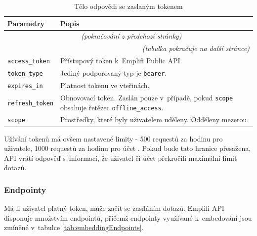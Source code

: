 \documentclass[czech, bc, kiv, he, iso690numb, viewonly]{fasthesis} %
\begin{document}
	\begin{longtable}{p{}p{}}
	\caption{Tělo odpovědi se zaslaným tokenem \cite{emplifiDocs}}
	\label{tab:exampleRequestResponse}\\
	\toprule[1.5pt]
	\textbf{Parametry} & \textbf{Popis}\\
	\midrule
	\endfirsthead
	\multicolumn{2}{c}{\tablename{}~\thetable{} \textit{(pokračování z předchozí stránky)}}\\
	\endhead
	\midrule
	\multicolumn{2}{r}{\textit{(tabulka pokračuje na další stránce)}}\\
	\endfoot
	\bottomrule[1.5pt]
	\endlastfoot
	\verb"access_token" & Přístupový token k~Emplifi Public API. \\
	\midrule
	\verb"token_type" & Jediný podporovaný typ je \texttt{bearer}. \\
	\midrule
	\verb"expires_in" & Platnost tokenu ve vteřinách. \\
	\midrule
	\verb"refresh_token" & Obnovovací token. Zaslán pouze v~případě, pokud \verb"scope" obsahuje řetězec \texttt{offline\_access}.\\
	\midrule
	\verb"scope" & Prostředky, které byly uživatelem uděleny. Odděleny mezerou. \\
	\end{longtable}



Užívání tokenů má ovšem nastavené limity - 500 requestů za hodinu pro uživatele, 1000 requestů za hodinu pro účet \cite{emplifiDocs}. Pokud bude tato hranice přesažena,
API vrátí odpověď s~informací, že uživatel či účet překročili maximální limit dotazů.

\subsubsection{Endpointy}

Má-li uživatel platný token, může začít se zasíláním dotazů. Emplifi API disponuje množstvím endpointů, přičemž endpointy využívané k~embedování jsou zmíněné v~tabulce \ref{tab:embeddingEndpoints}. 
\end{document}
